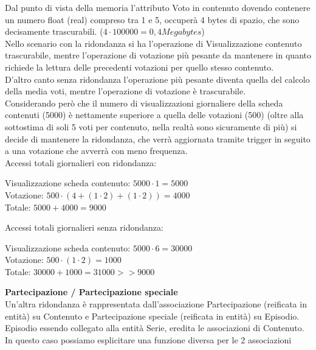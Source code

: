 \documentclass[a4paper]{article}
\begin{document}
Dal punto di vista della memoria l'attributo Voto in contenuto dovendo contenere un numero float (real) compreso tra 1 e 5, occuperà 
4 bytes di spazio, che sono decisamente trascurabili. ($ 4 \cdot 100000 = 0,4 Megabytes $)\\
Nello scenario con la ridondanza si ha l'operazione di Visualizzazione contenuto trascurabile, mentre l'operazione 
di votazione più pesante da mantenere in quanto richiede la lettura delle precedenti votazioni per quello stesso contenuto.\\
D'altro canto senza ridondanza l'operazione più pesante diventa quella del calcolo della media voti, mentre l'operazione di votazione 
è trascurabile. \\
Considerando però che il numero di visualizzazioni giornaliere della scheda contenuti (5000) è nettamente superiore 
a quella delle votazioni (500) (oltre alla sottostima di soli 5 voti per contenuto, nella realtà sono sicuramente di più) 
si decide di mantenere la ridondanza, che verrà aggiornata tramite trigger in seguito a una votazione che avverrà con meno frequenza.\\
Accessi totali giornalieri con ridondanza: \\
\begin{center}
Visualizzazione scheda contenuto: \quad $ 5000 \cdot 1 = 5000 $ \\
Votazione: \quad $ 500 \cdot (4 + ( 1 \cdot 2) + ( 1 \cdot 2)) = 4000 $ \\
Totale: \quad $ 5000 + 4000  = 9000 $ \\
\end{center}
Accessi totali giornalieri senza ridondanza: \\
\begin{center}
Visualizzazione scheda contenuto: \quad $ 5000 \cdot 6 = 30000 $ \\
Votazione: \quad $ 500 \cdot ( 1 \cdot 2) = 1000 $ \\
Totale: \quad $ 30000 + 1000 = 31000 >> 9000$ \\
\end{center}
\textbf{Partecipazione / Partecipazione speciale}\\
Un'altra ridondanza è rappresentata dall'associazione Partecipazione (reificata in entità) su Contenuto e Partecipazione 
speciale (reificata in entità) su Episodio.\\
Episodio essendo collegato alla entità Serie, eredita le associazioni di Contenuto. \\
In questo caso possiamo esplicitare una funzione diversa per le 2 associazioni
\end{document}

